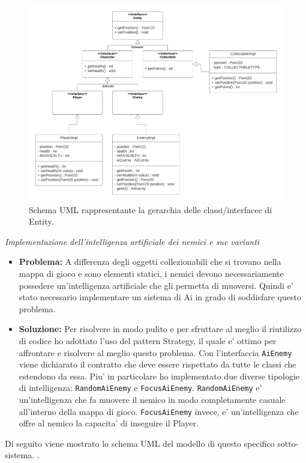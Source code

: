 \documentclass[a4paper,12pt]{report}
\begin{document}
\begin{itemize}
\begin{figure}[H]
        \includegraphics[width=\textwidth,height=\textheight,keepaspectratio]{img/EntityUML.pdf}
        \caption{Schema UML rappresentante la gerarchia delle classi/interfacce di Entity.}
        \label{img:EntityUML}
    \end{figure}
\end{itemize}
\textit{Implementazione dell'intelligenza artificiale dei nemici e sue varianti}
\begin{itemize}
    \item \textbf{Problema:} A differenza degli oggetti collezionabili che si trovano nella mappa di gioco e sono elementi statici, i nemici devono necessariamente possedere un'intelligenza artificiale che gli permetta di muoversi. Quindi e' stato necessario implementare un sistema di Ai in grado di soddisfare questo problema.
    \item \textbf{Soluzione:} Per risolvere in modo pulito e per sfruttare al meglio il riutilizzo di codice ho adottato l'uso del pattern Strategy, il quale e' ottimo per affrontare e risolvere al meglio questo problema. Con l'interfaccia \verb|AiEnemy| viene dichiarato il contratto che deve essere rispettato da tutte le classi che estendono da essa. Piu' in particolare ho implementato due diverse tipologie di intelligenza: \verb|RandomAiEnemy| e \verb|FocusAiEnemy|.
    \verb|RandomAiEnemy| e' un'intelligenza che fa muovere il nemico in modo completamente casuale all'interno della mappa di gioco.
    \verb|FocusAiEnemy| invece, e' un'intelligenza che offre al nemico la capacita' di inseguire il Player.
\end{itemize}
Di seguito viene mostrato lo schema UML del modello di questo specifico sotto-sistema. .
\end{document}
